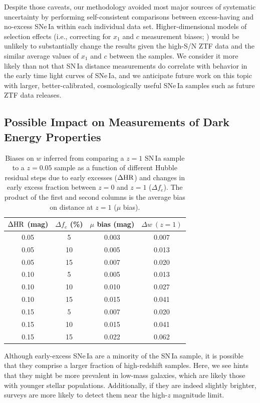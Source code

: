 \documentclass[twocolumn,twocolappendix, linenumbers]{aastex631} %
\begin{document}
Despite those caveats, our methodology avoided most major sources of systematic uncertainty by performing self-consistent comparisons between excess-having and no-excess SNe\,Ia within each individual data set.  Higher-dimensional models of selection effects (i.e., correcting for $x_1$ and $c$ measurement biases; \citealp{Kessler17}) would be unlikely to substantially change the results given the high-S/N ZTF data and the similar average values of $x_1$ and $c$ between the samples.  We consider it more likely than not that SN\,Ia distance measurements do correlate with behavior in the early time light curves of SNe\,Ia, and we anticipate future work on this topic with larger, better-calibrated, cosmologically useful SNe\,Ia samples such as future ZTF data releases.

\subsection{Possible Impact on Measurements of Dark Energy Properties}

\begin{table}[ht]
\centering
\begin{tabular}{ |c|c|c|c|} 
 \hline
  $\Delta {\rm HR}$ (mag)&$\Delta f_{e}$ (\%)&$\mu$ bias (mag)&$\Delta w\ (z = 1)$\\
 \hline
0.05&5&0.003&0.007\\
0.05&10&0.005&0.013\\
0.05&15&0.007&0.020\\
0.10&5&0.005&0.013\\
0.10&10&0.010&0.027\\
0.10&15&0.015&0.041\\
0.15&5&0.007&0.020\\
0.15&10&0.015&0.041\\
0.15&15&0.022&0.062\\
 \hline
\end{tabular}
\caption{Biases on $w$ inferred from comparing a $z = 1$ SN\,Ia sample to a $z = 0.05$ sample as a function of different Hubble residual steps due to early excesses ($\Delta {\rm HR}$) and changes in early excess fraction between $z = 0$ and $z = 1$ ($\Delta f_{e}$).  The product of the first and second columns is the average bias on distance at $z = 1$ ($\mu$ bias).}
\label{table:w}
\end{table}

Although early-excess SNe\,Ia  are a minority of the SN\,Ia sample, it is possible that they comprise a larger fraction of high-redshift samples.  Here, we see hints that they might be more prevalent in low-mass galaxies, which are likely those with younger stellar populations.  Additionally, if they are indeed slightly brighter, surveys are more likely to detect them near the high-$z$ magnitude limit.
\end{document}
